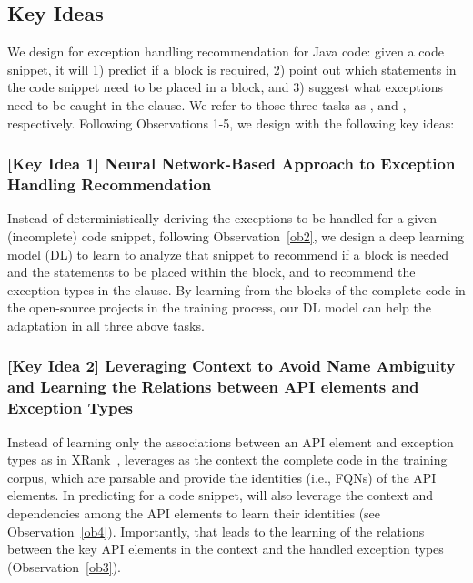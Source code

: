 \subsection{Key Ideas}
\label{key:sec}

We design {\tool} for exception handling recommendation for
Java code: given a code snippet, it will 1) predict if a
 block is required, 2) point out which statements in
the code snippet need to be placed in a  block, and 3)
suggest what exceptions need to be caught in the 
clause. We refer to those three tasks as {\xblock}, {\xstate} and
{\xtype}, respectively. Following Observations 1-5, we design {\tool}
with the following key ideas:



\subsubsection{{\bf [Key Idea 1] Neural Network-Based Approach to Exception Handling Recommendation}}
Instead of deterministically deriving the exceptions to be handled for
a given (incomplete) code snippet, following Observation~\ref{ob2}, we
design a deep learning model (DL) to learn to analyze that snippet to
recommend if a  block is needed and the statements to
be placed within the  block, and to recommend the
exception types in the  clause.  By learning from the
 blocks of the complete code in the open-source
projects in the training process, our DL model can help the adaptation
in all three above tasks.




\vspace{2pt}
\subsubsection{{\bf [Key Idea 2] Leveraging Context to Avoid
Name Ambiguity and Learning the Relations between API elements and
Exception Types}} Instead of learning only the associations between an
API element and exception types as in XRank~\cite{xrank-fse20},
{\tool} leverages as the context the complete code in the training
corpus, which are parsable and provide the identities (i.e., FQNs) of
the API elements. In predicting for a code snippet, {\tool} will also
leverage the context and dependencies among the API elements to learn
their identities (see Observation~\ref{ob4}). Importantly,
that leads to the learning of the relations between the key API
elements in the context and the handled exception types
(Observation~\ref{ob3}).

